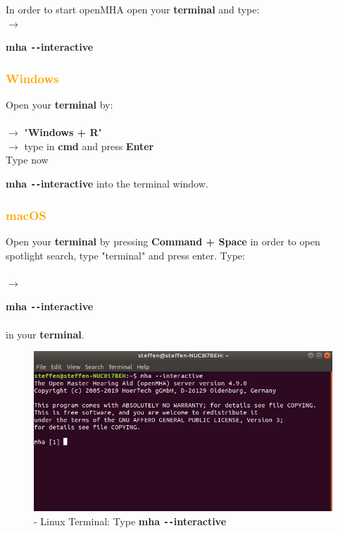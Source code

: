 \documentclass[11pt,a4paper,twoside]{article}
\newcommand{\+}{\discretionary{\mbox{\scriptsize$\hookleftarrow$}}{}{}}
\begin{document}
In order to start openMHA open your \textbf{terminal} and type: \\
$\rightarrow$ {{\ttfamily \textbf{mha \texttt{-{}-}interactive}} 


\subsubsection*{\textcolor{orange}{Windows}}}
Open your \textbf{terminal} by: \\ \\
$\rightarrow$ "\textbf{Windows + R}" \\
    $\rightarrow$ type in {{\ttfamily \textbf{cmd}}} and press \textbf{Enter} \\
    Type now {{\ttfamily \textbf{mha \texttt{-{}-}interactive}}  into the terminal window. 
   


\subsubsection*{\textcolor{orange}{macOS}}

Open your \textbf{terminal} by pressing \textbf{Command + Space} in order to open spotlight search, type "terminal" and press enter. Type: \\ \\
$\rightarrow$ {{\ttfamily \textbf{mha \texttt{-{}-}interactive}} \\ \\ in your \textbf{terminal}.\\


\begin{figure}[H]
\centering
\includegraphics[scale=0.4]{mha_interactive.png}
\caption{- Linux Terminal: Type {{\ttfamily \textbf{mha \texttt{-{}-}interactive}}}}
\end{figure}


}}
\end{document}

